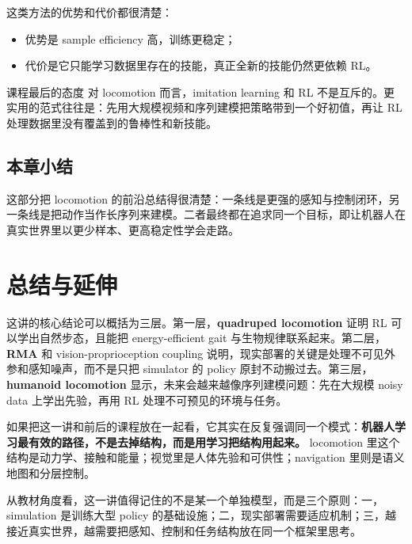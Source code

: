 \documentclass[a4paper]{article}
\begin{document}
这类方法的优势和代价都很清楚：

\begin{itemize}
  \item 优势是 sample efficiency 高，训练更稳定；
  \item 代价是它只能学习数据里存在的技能，真正全新的技能仍然更依赖 RL。
\end{itemize}

\begin{importantbox}{课程最后的态度}
对 locomotion 而言，imitation learning 和 RL 不是互斥的。更实用的范式往往是：先用大规模视频和序列建模把策略带到一个好初值，再让 RL 处理数据里没有覆盖到的鲁棒性和新技能。
\end{importantbox}

\subsection{本章小结}
这部分把 locomotion 的前沿总结得很清楚：一条线是更强的感知与控制闭环，另一条线是把动作当作长序列来建模。二者最终都在追求同一个目标，即让机器人在真实世界里以更少样本、更高稳定性学会走路。

\section{总结与延伸}
这讲的核心结论可以概括为三层。第一层，\textbf{quadruped locomotion} 证明 RL 可以学出自然步态，且能把 energy-efficient gait 与生物规律联系起来。第二层，\textbf{RMA} 和 vision-proprioception coupling 说明，现实部署的关键是处理不可见外参和感知噪声，而不是只把 simulator 的 policy 原封不动搬过去。第三层，\textbf{humanoid locomotion} 显示，未来会越来越像序列建模问题：先在大规模 noisy data 上学出先验，再用 RL 处理不可预见的环境与任务。

如果把这一讲和前后的课程放在一起看，它其实在反复强调同一个模式：\textbf{机器人学习最有效的路径，不是去掉结构，而是用学习把结构用起来。} locomotion 里这个结构是动力学、接触和能量；视觉里是人体先验和可供性；navigation 里则是语义地图和分层控制。

从教材角度看，这一讲值得记住的不是某一个单独模型，而是三个原则：一，simulation 是训练大型 policy 的基础设施；二，现实部署需要适应机制；三，越接近真实世界，越需要把感知、控制和任务结构放在同一个框架里思考。
\end{document}
